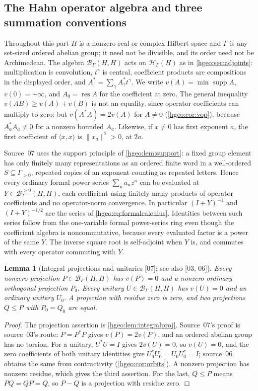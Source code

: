 \documentclass[11pt,letterpaper]{article}
\numberwithin{equation}{section}
\newtheorem{lemma}[lemma]{Lemma}
\theoremstyle{definition}
\theoremstyle{remark}
\newcommand{\HH}[1]{\mathscr H_\Gamma(#1)}
\newcommand{\BH}{\mathscr B_\Gamma(H,H)}
\newcommand{\Bpos}[2]{\mathscr B^{>0}_\Gamma(#1,#2)}
\newcommand{\supp}{\operatorname{supp}}
\newcommand{\res}{\operatorname{res}}
\newcommand{\ip}[2]{\langle #1,#2\rangle}
\newcommand{\norm}[1]{\lVert #1\rVert}
\newcommand{\src}[1]{\textup{\textsf{\small[#1]}}}
\begin{document}
\subsection{The Hahn operator algebra and three summation conventions}
\label{hgeo:us:sub:algebra}
Throughout this part $H$ is a nonzero real or complex Hilbert space and
$\Gamma$ is any set-sized ordered abelian group; it need not be divisible, and
its order need not be Archimedean. The algebra $\BH$ acts on $\HH{H}$ as in
\cref{hgeo:sec:adjoints}: multiplication is convolution, $t^\gamma$ is
central, coefficient products are compositions in the displayed order, and
$A^*=\sum_\gamma A_\gamma^*t^\gamma$. We write $v(A)=\min\supp A$,
$v(0)=+\infty$, and $A_0=\res A$ for the coefficient at zero. The general
inequality $v(AB)\ge v(A)+v(B)$ is not an equality, since operator
coefficients can multiply to zero; but $v(A^*A)=2v(A)$ for $A\ne0$
(\cref{hgeo:cor:vop}), because $A_a^*A_a\ne0$ for a nonzero bounded $A_a$.
Likewise, if $x\ne0$ has first exponent $a$, the first coefficient of
$\ip{x}{x}$ is $\norm{x_a}^2>0$, at $2a$.

Source~07 uses the support principle of \cref{hgeo:lem:support}: a fixed
group element has only finitely many representations as an ordered finite
word in a well-ordered $S\subseteq\Gamma_{>0}$, repeated copies of an exponent
counting as repeated letters. Hence every ordinary formal power series
$\sum_na_nz^n$ can be evaluated at $Y\in\Bpos{H}{H}$, each coefficient using
finitely many products of operator coefficients and no operator-norm
convergence. In particular $(I+Y)^{-1}$ and $(I+Y)^{-1/2}$ are the series of
\eqref{hgeo:eq:formalcalculus}. Identities between such series follow from the
one-variable formal power-series ring even though the coefficient algebra is
noncommutative, because every evaluated factor is a power of the same $Y$.
The inverse square root is self-adjoint when $Y$ is, and commutes with every
operator commuting with $Y$.

\begin{lemma}[Integral projections and unitaries \src{07}; see also
\src{03, 06}]\label{hgeo:us:lem:integral}
Every nonzero projection $P\in\BH$ has $v(P)=0$ and a nonzero ordinary
orthogonal projection $P_0$. Every unitary $U\in\BH$ has $v(U)=0$ and an
ordinary unitary $U_0$. A projection with residue zero is zero, and two
projections $Q\le P$ with $P_0=Q_0$ are equal.
\end{lemma}
\begin{proof}
The projection assertion is \cref{hgeo:lem:integralproj}. Source~07's proof
is source~03's route: $P=P^*P$ gives $v(P)=2v(P)$, and an ordered abelian
group has no torsion. For a unitary, $U^*U=I$ gives $2v(U)=0$, so $v(U)=0$, and
the zero coefficients of both unitary identities give $U_0^*U_0=U_0U_0^*=I$;
source~06 obtains the same from contractivity (\cref{hgeo:cor:orbits}). A
nonzero projection has nonzero residue, which gives the third assertion. For
the last, $Q\le P$ means $PQ=QP=Q$, so $P-Q$ is a projection with residue
zero.
\end{proof}
\end{document}
